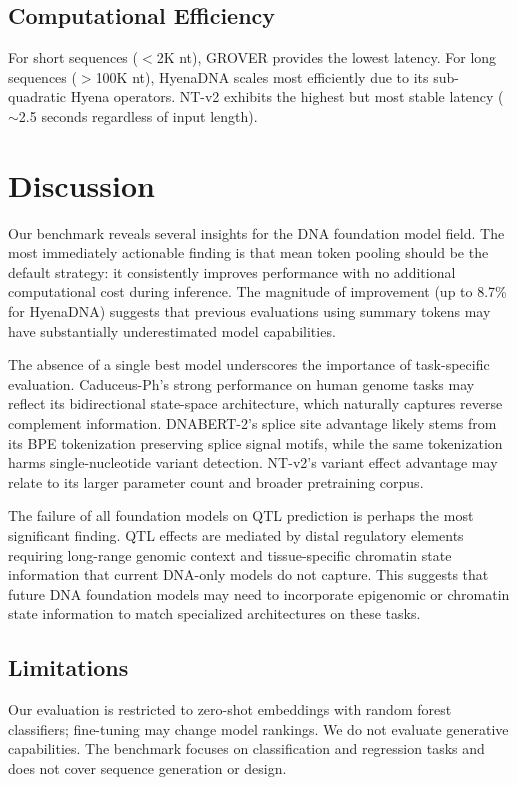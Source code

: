 \documentclass[11pt]{article}
\begin{document}
\subsection{Computational Efficiency}

For short sequences ($<$2K nt), GROVER provides the lowest latency. For long sequences ($>$100K nt), HyenaDNA scales most efficiently due to its sub-quadratic Hyena operators. NT-v2 exhibits the highest but most stable latency ($\sim$2.5 seconds regardless of input length).

\section{Discussion}

Our benchmark reveals several insights for the DNA foundation model field. The most immediately actionable finding is that mean token pooling should be the default strategy: it consistently improves performance with no additional computational cost during inference. The magnitude of improvement (up to 8.7\% for HyenaDNA) suggests that previous evaluations using summary tokens may have substantially underestimated model capabilities.

The absence of a single best model underscores the importance of task-specific evaluation. Caduceus-Ph's strong performance on human genome tasks may reflect its bidirectional state-space architecture, which naturally captures reverse complement information. DNABERT-2's splice site advantage likely stems from its BPE tokenization preserving splice signal motifs, while the same tokenization harms single-nucleotide variant detection. NT-v2's variant effect advantage may relate to its larger parameter count and broader pretraining corpus.

The failure of all foundation models on QTL prediction is perhaps the most significant finding. QTL effects are mediated by distal regulatory elements requiring long-range genomic context and tissue-specific chromatin state information that current DNA-only models do not capture. This suggests that future DNA foundation models may need to incorporate epigenomic or chromatin state information to match specialized architectures on these tasks.

\subsection{Limitations}
Our evaluation is restricted to zero-shot embeddings with random forest classifiers; fine-tuning may change model rankings. We do not evaluate generative capabilities. The benchmark focuses on classification and regression tasks and does not cover sequence generation or design.
\end{document}

